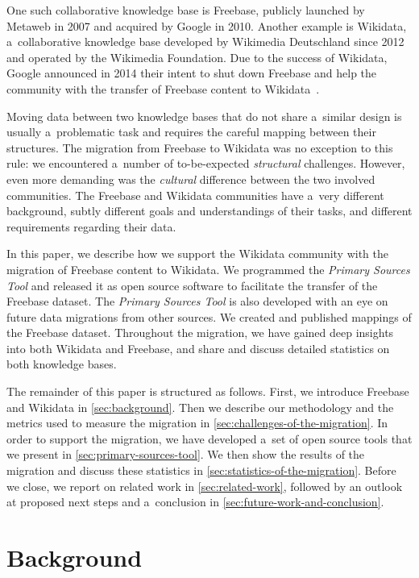 \documentclass{sig-alternate-2013}
\begin{document}
One such collaborative knowledge base is Freebase,
publicly launched by Metaweb in 2007 and acquired by Google in 2010.
Another example is Wikidata, a~collaborative know\-ledge base developed by
Wikimedia Deutschland since 2012 and operated by the Wikimedia Foundation.
Due to the success of Wikidata, Google announced in 2014 their intent to shut down Freebase and
help the community with the transfer of Freebase content to Wikidata~\cite{freebase2014shutdown}.

Moving data between two knowledge bases that do not share a~similar design
is usually a~problematic task and requires the careful mapping between their structures.
The migration from Freebase to Wikidata was no exception to this rule:
we encountered a~number of to-be-expected \emph{structural} challenges.
However, even more demanding was the \emph{cultural} difference between the two involved communities.
The Freebase and Wikidata communities have a~very different background,
subtly different goals and understandings of their tasks,
and different requirements regarding their data.

In this paper, we describe how we support the Wikidata community with
the migration of Freebase content to Wikidata.
We programmed the \emph{Primary Sources Tool} and
released it as open source software to facilitate the transfer of the Freebase dataset.
The \emph{Primary Sources Tool} is also developed with an eye on
future data migrations from other sources.
We created and published mappings of the Freebase dataset.
Throughout the migration, we have gained deep insights into both Wikidata and Freebase,
and share and discuss detailed statistics on both knowledge bases.

The remainder of this paper is structured as follows.
First, we introduce Freebase and Wikidata in \autoref{sec:background}.
Then we describe our methodology and the metrics used to measure the migration
in \autoref{sec:challenges-of-the-migration}.
In order to support the migration, we have developed a~set of open source tools
that we present in \autoref{sec:primary-sources-tool}.
We then show the results of the migration
and discuss these statistics in \autoref{sec:statistics-of-the-migration}.
Before we close, we report on related work in \autoref{sec:related-work},
followed by an outlook at proposed next steps
and a~conclusion in \autoref{sec:future-work-and-conclusion}.

\section{Background}\label{sec:background}
\end{document}
